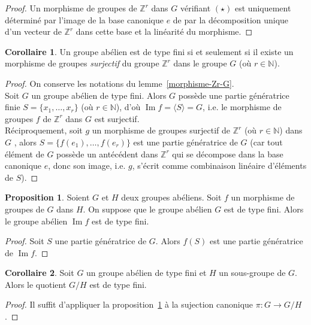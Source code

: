 \documentclass{article}
\newcommand{\Z}{\mathbb{Z}}
\newcommand{\N}{\mathbb{N}}
\newcommand{\im}{\mathop{\mathrm{Im}}\nolimits}
\theoremstyle{definition}
\newtheorem{prop}{Proposition}
\newtheorem{coro}{Corollaire}
\theoremstyle{remark}
\begin{document}
\begin{proof}
Un morphisme de groupes de $\Z^r$ dans $G$ vérifiant $(\star)$ est uniquement déterminé par l'image de la base canonique $e$ de par la décomposition unique d'un vecteur de $\Z^r$ dans cette base et la linéarité du morphisme.
\end{proof}

\begin{coro}\label{type-fini-et-Zr}
Un groupe abélien est de type fini si et seulement si il existe un morphisme de groupes \textit{surjectif} du groupe $\Z^r$ dans le groupe $G$ (où $r \in \N$).
\end{coro}

\begin{proof}
On conserve les notations du lemme~\ref{morphisme-Zr-G}. \\
Soit $G$ un groupe abélien de type fini. Alors $G$ possède une partie génératrice finie $S=\{x_1, \ldots, x_r \}$ (où $r \in \N$), d'où $\im f=\langle S\rangle=G$,
i.e. le morphisme de groupes $f$ de $\Z^r$ dans $G$ est surjectif. \\
Réciproquement, soit $g$ un morphisme de groupes surjectif de $\Z^r$ (où $r \in \N$) dans $G$ , alors $S=\{f(e_1), \ldots, f(e_r) \}$ est une partie génératrice de $G$ (car tout élément de $G$ possède un antécédent dans $\Z^r$ qui se décompose dans la base canonique $e$, donc son image, i.e. $g$, s'écrit comme combinaison linéaire d'éléments de $S$). 
\end{proof}

\begin{prop}\label{image-type-fini}
Soient $G$ et $H$ deux groupes abéliens. Soit $f$ un morphisme de groupes de $G$ dans $H$. On suppose que le groupe abélien $G$ est de type fini. Alors le groupe abélien $\im f$ est de type fini.
\end{prop}

\begin{proof}
Soit $S$ une partie génératrice de $G$. Alors $f(S)$ est une partie génératrice de $\im f$.
\end{proof}

\begin{coro}
Soit $G$ un groupe ab\'elien de type fini et $H$ un sous-groupe de $G$. Alors le quotient $G/H$ est de type fini.
\end{coro}

\begin{proof}
Il suffit d'appliquer la proposition~\ref{image-type-fini} \`a la sujection canonique $\pi:G\to G/H$.
\end{proof}
\end{document}
